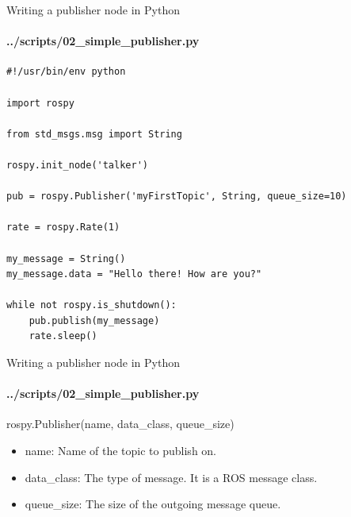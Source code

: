 \documentclass{beamer}
\begin{document}
\begin{frame}[fragile]{Writing a publisher node in Python}
    \framesubtitle{../scripts/02\_simple\_publisher.py}
    

                   
\begin{lstlisting}
#!/usr/bin/env python

import rospy

from std_msgs.msg import String

rospy.init_node('talker')

pub = rospy.Publisher('myFirstTopic', String, queue_size=10)

rate = rospy.Rate(1)

my_message = String()
my_message.data = "Hello there! How are you?"

while not rospy.is_shutdown():
    pub.publish(my_message)
    rate.sleep()
\end{lstlisting}
\end{frame}




\begin{frame}[fragile]{Writing a publisher node in Python}
    \framesubtitle{../scripts/02\_simple\_publisher.py}
    \begin{focus}
        \centering
        \fontsize{9}{1} \ttfamily rospy.Publisher({\color{blue}name}, {\color{blue}data\_class}, {\color{blue}queue\_size})
    \end{focus}
    
    \begin{itemize}
        \item {\ttfamily name}: Name of the topic to publish on.
        
        \item {\ttfamily data\_class}: The type of message. It is a ROS message class.
        
        \item {\ttfamily queue\_size}: The size of the outgoing message queue.
        
    \end{itemize}
\end{frame}
\end{document}
